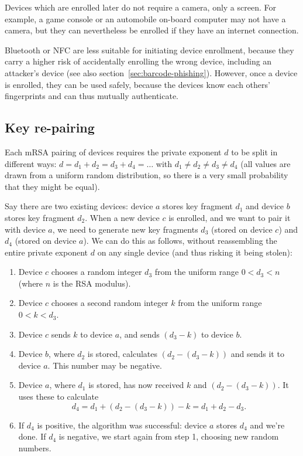 Devices which are enrolled later do not require a camera, only a screen. For example, a game console
or an automobile on-board computer may not have a camera, but they can nevertheless be enrolled if
they have an internet connection.

Bluetooth or NFC are less suitable for initiating device enrollment, because they carry a higher
risk of accidentally enrolling the wrong device, including an attacker's device (see also
section~\ref{sec:barcode-phishing}). However, once a device is enrolled, they can be used safely,
because the devices know each others' fingerprints and can thus mutually authenticate.

\subsection{Key re-pairing}\label{sec:pairing}

Each mRSA pairing of devices requires the private exponent $d$ to be split in different ways:
$d = d_1 + d_2 = d_3 + d_4 = \dots$ with $d_1 \neq d_2 \neq d_3 \neq d_4$ (all values are drawn from
a uniform random distribution, so there is a very small probability that they might be equal).

Say there are two existing devices: device $a$ stores key fragment $d_1$ and device $b$ stores key
fragment $d_2$. When a new device $c$ is enrolled, and we want to pair it with device $a$, we need
to generate new key fragments $d_3$ (stored on device $c$) and $d_4$ (stored on device $a$). We can
do this as follows, without reassembling the entire private exponent $d$ on any single device (and
thus risking it being stolen):

\begin{enumerate}
\item Device $c$ chooses a random integer $d_3$ from the uniform range $0 < d_3 < n$ (where $n$ is
the RSA modulus).
\item Device $c$ chooses a second random integer $k$ from the uniform range $0 < k < d_3$.
\item Device $c$ sends $k$ to device $a$, and sends $(d_3 - k)$ to device $b$.
\item Device $b$, where $d_2$ is stored, calculates $(d_2 - (d_3 - k))$ and sends it to device $a$.
This number may be negative.
\item Device $a$, where $d_1$ is stored, has now received $k$ and $(d_2 - (d_3 - k))$. It uses these
to calculate $$d_4 = d_1 + (d_2 - (d_3 - k)) - k = d_1 + d_2 - d_3.$$
\item If $d_4$ is positive, the algorithm was successful: device $a$ stores $d_4$ and we're done. If
$d_4$ is negative, we start again from step 1, choosing new random numbers.
\end{enumerate}

